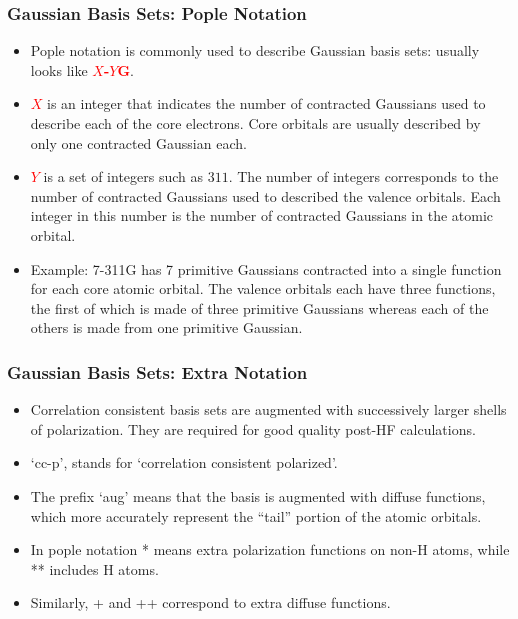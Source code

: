 \documentclass{beamer}
\newenvironment{noheadline}{
	\setbeamertemplate{headline}{}
	\addtobeamertemplate{frametitle}{\vspace*{-0.9\baselineskip}}{}
}{}
\newcommand{\bb}[1]{\textcolor{red}{\textbf{#1}}}
\begin{document}
\begin{noheadline}
\begin{frame}
\frametitle{Gaussian Basis Sets: Pople Notation}
\begin{itemize}
	\item Pople notation is commonly used to describe Gaussian basis sets: usually looks like \bb{$X$-$Y$G}.
	\item \bb{$X$} is an integer that indicates the number of contracted Gaussians used to describe each of the core electrons. Core orbitals are usually described by only one contracted Gaussian each.
	\item \bb{$Y$} is a set of integers such as $311$. The number of integers corresponds to the number of contracted Gaussians used to described the valence orbitals. Each integer in this number is the number of contracted Gaussians in the atomic orbital.
	\item Example: 7-311G has 7 primitive Gaussians contracted into a single function for each core atomic orbital. The valence orbitals each have three functions, the first of which is made of three primitive Gaussians whereas each of the others is made from one primitive Gaussian.
\end{itemize}
\end{frame}

\begin{frame}
\frametitle{Gaussian Basis Sets: Extra Notation}
\begin{itemize}
	\item Correlation consistent basis sets are augmented with successively larger shells of polarization. They are required for good quality post-HF calculations.
	\item `cc-p', stands for `correlation consistent polarized'.
	\item The prefix `aug' means that the basis is augmented with diffuse functions, which more	accurately represent the ``tail'' portion of the atomic orbitals.
	\item In pople notation * means extra polarization functions on non-H atoms, while ** includes H atoms.
	\item Similarly, + and ++ correspond to extra diffuse functions.
\end{itemize}
\end{frame}



\end{noheadline}
\end{document}
